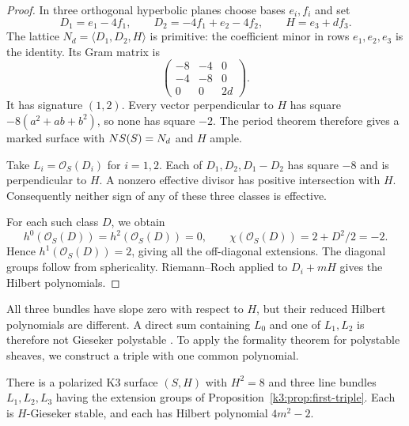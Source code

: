 \begin{proof}
In three orthogonal hyperbolic planes choose bases $e_i,f_i$ and set
\[
D_1=e_1-4f_1,\qquad
D_2=-4f_1+e_2-4f_2,\qquad H=e_3+df_3.
\]
The lattice $N_d=\langle D_1,D_2,H\rangle$ is primitive: the coefficient
minor in rows $e_1,e_2,e_3$ is the identity.  Its Gram matrix is
\[
\begin{pmatrix}-8&-4&0\\-4&-8&0\\0&0&2d\end{pmatrix}.
\]
It has signature $(1,2)$.  Every vector perpendicular to $H$ has
square $-8(a^2+ab+b^2)$, so none has square $-2$.  The period theorem
therefore gives a marked surface with $NS(S)=N_d$ and $H$ ample.

Take $L_i=\mathcal O_S(D_i)$ for $i=1,2$.  Each of
$D_1,D_2,D_1-D_2$ has square $-8$ and is perpendicular to $H$.
A nonzero effective divisor has positive intersection with $H$.
Consequently neither sign of any of these three classes is effective.

For each such class $D$, we obtain
\[
h^0(\mathcal O_S(D))=h^2(\mathcal O_S(D))=0,
\qquad \chi(\mathcal O_S(D))=2+D^2/2=-2.
\]
Hence $h^1(\mathcal O_S(D))=2$, giving all the off-diagonal
extensions.  The diagonal groups follow from sphericality.
Riemann--Roch applied to $D_i+mH$ gives the Hilbert polynomials.
\end{proof}

All three bundles have slope zero with respect to $H$, but their
reduced Hilbert polynomials are different.  A direct sum containing
$L_0$ and one of $L_1,L_2$ is therefore not Gieseker polystable
\cite[Definitions 1.2.3--1.2.4]{HuybrechtsLehn}.
To apply the formality theorem for polystable sheaves, we construct a
triple with one common polynomial.

\begin{theorem}
\label{k3:thm:common-triple}
There is a polarized K3 surface $(S,H)$ with $H^2=8$ and three line
bundles $L_1,L_2,L_3$ having the extension groups of
Proposition~\ref{k3:prop:first-triple}.  Each is $H$-Gieseker stable,
and each has Hilbert polynomial $4m^2-2$.
\end{theorem}


